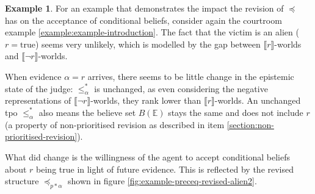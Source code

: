 \documentclass[english, 12pt]{scrartcl}
\theoremstyle{definition}
\newtheorem{example}{Example}
\theoremstyle{definition}
\theoremstyle{definition}
\newcommand{\modelsOf}[1]{\llbracket #1 \rrbracket}
\begin{document}
\begin{example}
    \label{example:example-preceq-revised-alien}
    For an example that demonstrates the impact the revision of $\preceq$ has on the acceptance of conditional beliefs, consider again the courtroom example \ref{example:example-introduction}. The fact that the victim is an alien ($r=\textrm{true}$) seems very unlikely, which is modelled by the gap between $\modelsOf{r}$-worlds and $\modelsOf{\neg r}$-worlds.
    
    When evidence $\alpha = r$ arrives, there seems to be little change in the epistemic state of the judge: $\leq_{\alpha}^{\ast}$ is unchanged, as even considering the negative representations of $\modelsOf{\neg r}$-worlds, they rank lower than $\modelsOf{r}$-worlds. An unchanged tpo $\leq_{\alpha}^{\ast}$ also means the believe set $B(\mathbb{E})$ stays the same and does not include $r$ (a property of non-prioritised revision as described in item \ref{section:non-prioritised-revision}).
    
    What did change is the willingness of the agent to accept conditional beliefs about $r$ being true in light of future evidence. This is reflected by the revised structure $\preceq_{p \ast \alpha}$ shown in figure \ref{fig:example-preceq-revised-alien2}.

    \begin{figure}[H]
            \centering
\end{figure}
\end{example}
\end{document}
